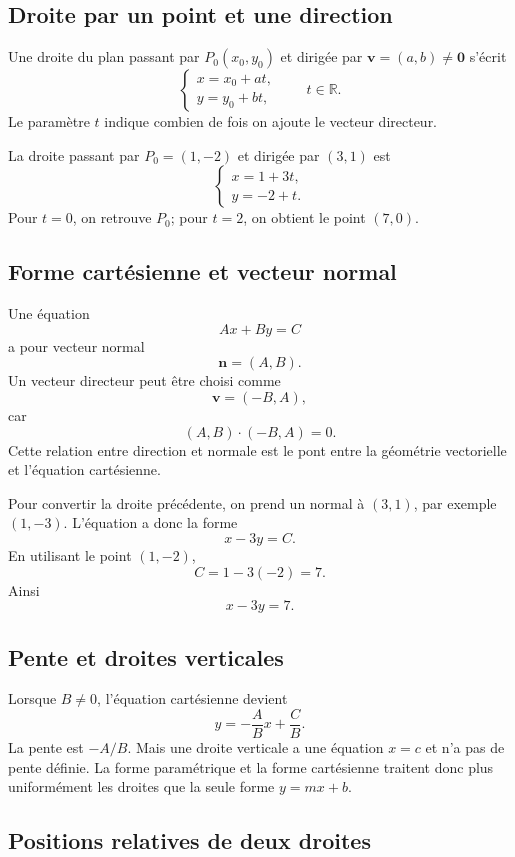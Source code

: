 \documentclass[12pt,a4paper,openany]{book}
\newcommand{\R}{\mathbb{R}}
\begin{document}
\subsection{Droite par un point et une direction}

Une droite du plan passant par $P_0(x_0,y_0)$ et dirigée par $\mathbf v=(a,b)\neq\mathbf0$ s'écrit
\[
\begin{cases}
x=x_0+at,\\y=y_0+bt,
\end{cases}
\qquad t\in\R.
\]
Le paramètre $t$ indique combien de fois on ajoute le vecteur directeur.

\begin{examplebox}
La droite passant par $P_0=(1,-2)$ et dirigée par $(3,1)$ est
\[
\begin{cases}
x=1+3t,\\y=-2+t.
\end{cases}
\]
Pour $t=0$, on retrouve $P_0$; pour $t=2$, on obtient le point $(7,0)$.
\end{examplebox}

\subsection{Forme cartésienne et vecteur normal}

Une équation
\[
Ax+By=C
\]
a pour vecteur normal
\[
\mathbf n=(A,B).
\]
Un vecteur directeur peut être choisi comme
\[
\mathbf v=(-B,A),
\]
car
\[
(A,B)\cdot(-B,A)=0.
\]
Cette relation entre direction et normale est le pont entre la géométrie vectorielle et l'équation cartésienne.

Pour convertir la droite précédente, on prend un normal à $(3,1)$, par exemple $(1,-3)$. L'équation a donc la forme
\[
x-3y=C.
\]
En utilisant le point $(1,-2)$,
\[
C=1-3(-2)=7.
\]
Ainsi
\[
x-3y=7.
\]

\subsection{Pente et droites verticales}

Lorsque $B\neq0$, l'équation cartésienne devient
\[
y=-\frac ABx+\frac CB.
\]
La pente est $-A/B$. Mais une droite verticale a une équation $x=c$ et n'a pas de pente définie. La forme paramétrique et la forme cartésienne traitent donc plus uniformément les droites que la seule forme $y=mx+b$.

\subsection{Positions relatives de deux droites}
\end{document}
